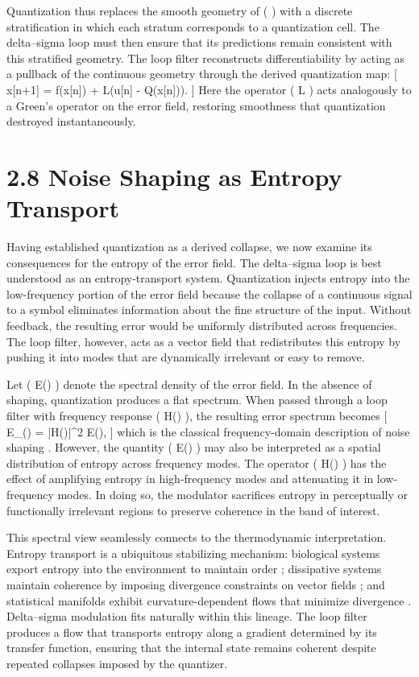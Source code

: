 Quantization thus replaces the smooth geometry of (  ) with a discrete stratification in which each stratum corresponds to a quantization cell. The delta--sigma loop must then ensure that its predictions remain consistent with this stratified geometry. The loop filter reconstructs differentiability by acting as a pullback of the continuous geometry through the derived quantization map:
[
x[n+1] = f(x[n]) + L(u[n] - Q(x[n])).
]
Here the operator ( L ) acts analogously to a Green's operator on the error field, restoring smoothness that quantization destroyed instantaneously.

\section*{2.8 Noise Shaping as Entropy Transport}

Having established quantization as a derived collapse, we now examine its consequences for the entropy of the error field. The delta--sigma loop is best understood as an entropy-transport system. Quantization injects entropy into the low-frequency portion of the error field because the collapse of a continuous signal to a symbol eliminates information about the fine structure of the input. Without feedback, the resulting error would be uniformly distributed across frequencies. The loop filter, however, acts as a vector field that redistributes this entropy by pushing it into modes that are dynamically irrelevant or easy to remove.

Let ( E(\omega) ) denote the spectral density of the error field. In the absence of shaping, quantization produces a flat spectrum. When passed through a loop filter with frequency response ( H(\omega) ), the resulting error spectrum becomes
[
E_{}(\omega) = |H(\omega)|^2 E(\omega),
]
which is the classical frequency-domain description of noise shaping \citep{candy1992oversampling}. However, the quantity ( E(\omega) ) may also be interpreted as a spatial distribution of entropy across frequency modes. The operator ( H(\omega) ) has the effect of amplifying entropy in high-frequency modes and attenuating it in low-frequency modes. In doing so, the modulator sacrifices entropy in perceptually or functionally irrelevant regions to preserve coherence in the band of interest.

This spectral view seamlessly connects to the thermodynamic interpretation. Entropy transport is a ubiquitous stabilizing mechanism: biological systems export entropy into the environment to maintain order \citep{friston2010free}; dissipative systems maintain coherence by imposing divergence constraints on vector fields \citep{willems1972dissipative}; and statistical manifolds exhibit curvature-dependent flows that minimize divergence \citep{amari2016information}. Delta--sigma modulation fits naturally within this lineage. The loop filter produces a flow that transports entropy along a gradient determined by its transfer function, ensuring that the internal state remains coherent despite repeated collapses imposed by the quantizer.

